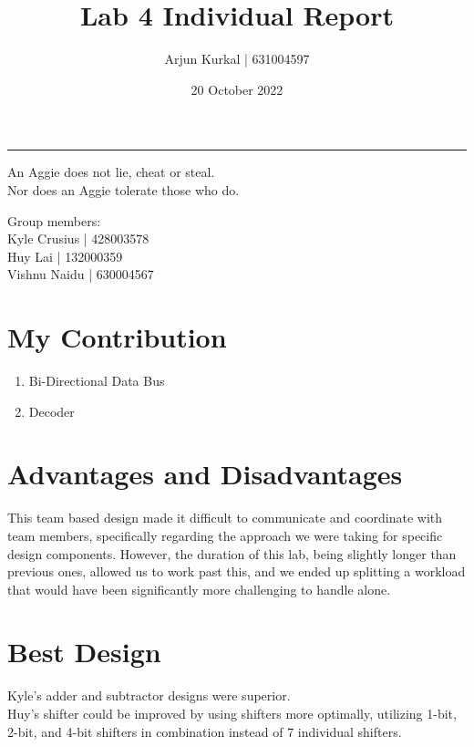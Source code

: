 \documentclass[fleqn,12pt]{article}
\title{\vspace{-2.5cm}Lab 4 Individual Report}
\author{
    Arjun Kurkal | 631004597
}
\affil{Texas A\&M University}
\date{\vspace{-28pt}20 October 2022}
\begin{document}
\maketitle
\begin{center}
\vspace{-42pt}
\rule{\textwidth}{.1pt}
{\large
An Aggie does not lie, cheat or steal.\\
Nor does an Aggie tolerate those who do.
}
\end{center}
\begin{center}
Group members:\\
Kyle Crusius | 428003578\\
Huy Lai | 132000359\\
Vishnu Naidu | 630004567
\end{center}

\section*{My Contribution}
\begin{enumerate}
    \item Bi-Directional Data Bus
    \item Decoder
\end{enumerate}

\section*{Advantages and Disadvantages}
This team based design made it difficult to communicate and coordinate with team members, specifically regarding the approach we were taking for specific design components. However, the duration of this lab, being slightly longer than previous ones, allowed us to work past this, and we ended up splitting a workload that would have been significantly more challenging to handle alone.

\section*{Best Design}
Kyle’s adder and subtractor designs were superior.\\
Huy's shifter could be improved by using shifters more optimally, utilizing 1-bit, 2-bit, and 4-bit shifters in combination instead of 7 individual shifters.
\end{document}
